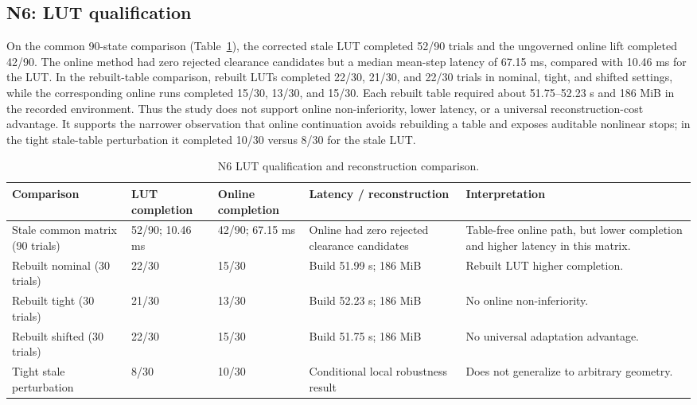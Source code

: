 \documentclass[preprint,12pt]{elsarticle}
\begin{document}
\subsection{N6: LUT qualification}

On the common 90-state comparison (Table~\ref{tab:n6_lut}), the corrected stale LUT completed 52/90 trials and the ungoverned online lift completed 42/90. The online method had zero rejected clearance candidates but a median mean-step latency of 67.15 ms, compared with 10.46 ms for the LUT. In the rebuilt-table comparison, rebuilt LUTs completed 22/30, 21/30, and 22/30 trials in nominal, tight, and shifted settings, while the corresponding online runs completed 15/30, 13/30, and 15/30. Each rebuilt table required about 51.75--52.23 s and 186 MiB in the recorded environment. Thus the study does not support online non-inferiority, lower latency, or a universal reconstruction-cost advantage. It supports the narrower observation that online continuation avoids rebuilding a table and exposes auditable nonlinear stops; in the tight stale-table perturbation it completed 10/30 versus 8/30 for the stale LUT.

\begin{table}[t]
\centering
\small
\caption{N6 LUT qualification and reconstruction comparison.}
\label{tab:n6_lut}
\begin{tabularx}{\textwidth}{@{}p{}p{}p{}p{}X@{}}
\toprule
Comparison & LUT completion & Online completion & Latency / reconstruction & Interpretation \\
\midrule
Stale common matrix (90 trials) & 52/90; 10.46 ms & 42/90; 67.15 ms & Online had zero rejected clearance candidates & Table-free online path, but lower completion and higher latency in this matrix. \\
Rebuilt nominal (30 trials) & 22/30 & 15/30 & Build 51.99 s; 186 MiB & Rebuilt LUT higher completion. \\
Rebuilt tight (30 trials) & 21/30 & 13/30 & Build 52.23 s; 186 MiB & No online non-inferiority. \\
Rebuilt shifted (30 trials) & 22/30 & 15/30 & Build 51.75 s; 186 MiB & No universal adaptation advantage. \\
Tight stale perturbation & 8/30 & 10/30 & Conditional local robustness result & Does not generalize to arbitrary geometry. \\
\bottomrule
\end{tabularx}
\end{table}
\end{document}
